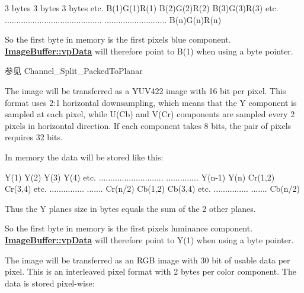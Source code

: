 \begin{Desc}
\begin{description}
\begin{DoxyCode}
3 bytes        3 bytes        3 bytes      etc.
B(1)G(1)R(1)   B(2)G(2)R(2)   B(3)G(3)R(3) etc.
..........................................
...........................   B(n)G(n)R(n)
\end{DoxyCode}


So the first byte in memory is the first pixels blue component. {\bfseries \hyperlink{struct_image_buffer_ab67c9c21d749e786302c848b508e0673}{Image\+Buffer\+::vp\+Data}} will therefore point to B(1) when using a byte pointer.

\begin{DoxySeeAlso}{参见}
Channel\+\_\+\+Split\+\_\+\+Packed\+To\+Planar 
\end{DoxySeeAlso}
\item[{\em 
\hypertarget{group___common_interface_gga02e0fc32ff10e0bc0f2e8b9c321d65c9a7820d9d90b4b787ef9bb44134ca3dfcd}{idpf\+Y\+U\+V422\+Planar}\label{group___common_interface_gga02e0fc32ff10e0bc0f2e8b9c321d65c9a7820d9d90b4b787ef9bb44134ca3dfcd}
}]The image will be transferred as a Y\+U\+V422 image with 16 bit per pixel. This format uses 2\+:1 horizontal downsampling, which means that the Y component is sampled at each pixel, while U(\+Cb) and V(\+Cr) components are sampled every 2 pixels in horizontal direction. If each component takes 8 bits, the pair of pixels requires 32 bits.

In memory the data will be stored like this\+:


\begin{DoxyCode}
Y(1)    Y(2)    Y(3)    Y(4) etc.
............................
..............  Y(n-1)  Y(n)
Cr(1,2) Cr(3,4) etc.
...............
....... Cr(n/2)
Cb(1,2) Cb(3,4) etc.
...............
....... Cb(n/2)
\end{DoxyCode}


Thus the Y planes size in bytes equals the sum of the 2 other planes.

So the first byte in memory is the first pixels luminance component. {\bfseries \hyperlink{struct_image_buffer_ab67c9c21d749e786302c848b508e0673}{Image\+Buffer\+::vp\+Data}} will therefore point to Y(1) when using a byte pointer. \item[{\em 
\hypertarget{group___common_interface_gga02e0fc32ff10e0bc0f2e8b9c321d65c9a668fe649968ab651bf85a5e45f0b70b4}{idpf\+R\+G\+B101010\+Packed}\label{group___common_interface_gga02e0fc32ff10e0bc0f2e8b9c321d65c9a668fe649968ab651bf85a5e45f0b70b4}
}]The image will be transferred as an R\+G\+B image with 30 bit of usable data per pixel. This is an interleaved pixel format with 2 bytes per color component. The data is stored pixel-\/wise\+:



\end{description}
\end{Desc}
